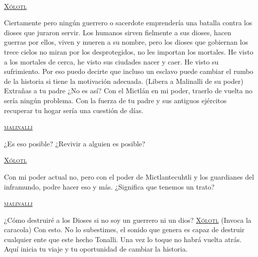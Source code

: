 \begin{center}
\\	
	\par
\textsc{\underline{Xólotl}}
\\	
	\par
Ciertamente pero ningún guerrero o sacerdote emprendería una batalla contra los dioses que juraron servir. Los humanos sirven fielmente a sus dioses, hacen guerras por ellos, viven y mueren a su nombre, pero los dioses que gobiernan los trece cielos no miran por los desprotegidos, no les importan los mortales. He visto a los mortales de cerca, he visto sus ciudades nacer y caer. He visto su sufrimiento. Por eso puedo decirte que incluso un esclavo puede cambiar el rumbo de la historia si tiene la motivación adecuada.
(Libera a Malinalli de su poder)
Extrañas a tu padre ¿No es así? Con el Mictlán en mi poder, traerlo de vuelta no sería ningún problema. Con la fuerza de tu padre y sus antiguos ejércitos recuperar tu hogar sería una cuestión de días.  
\\	
	\par
\textsc{\underline{malinalli}}
\\	
	\par
¿Es eso posible? ¿Revivir a alguien es posible?
\\	
	\par
\textsc{\underline{Xólotl}}
\\	
	\par
Con mi poder actual no, pero con el poder de Mictlantecuhtli y los guardianes del inframundo, podre hacer eso y más. ¿Significa que tenemos un trato?
\\	
	\par
\textsc{\underline{malinalli}}
\\	
	\par
¿Cómo destruiré a los Dioses si no soy un guerrero ni un dios?
\textsc{\underline{Xólotl}}
(Invoca la caracola) Con esto. No lo subestimes, el sonido que genera es capaz de destruir cualquier ente que este hecho Tonalli. Una vez lo toque no habrá vuelta atrás. Aquí inicia tu viaje y tu oportunidad de cambiar la historia.
\end{center}